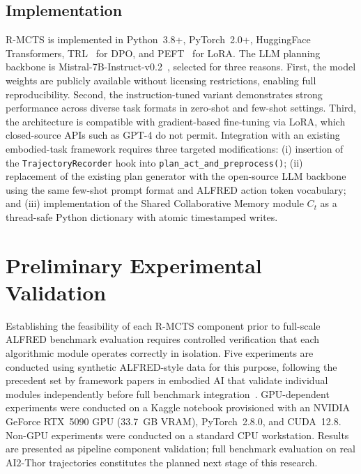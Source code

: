 \documentclass[pdflatex,sn-mathphys-num]{sn-jnl}
\theoremstyle{thmstyleone}
\theoremstyle{thmstyletwo}
\theoremstyle{thmstylethree}
\newcommand{\RMCTS}{\textsc{R-MCTS}}
\newcommand{\Ct}{C_{t}}
\begin{document}
\subsection{Implementation}

\RMCTS{} is implemented in Python~3.8+, PyTorch~2.0+, HuggingFace
Transformers, TRL~\cite{vonwerra2022trl} for DPO, and
PEFT~\cite{peft2022} for LoRA.
The LLM planning backbone is Mistral-7B-Instruct-v0.2~\cite{jiang2023mistral},
selected for three reasons.
First, the model weights are publicly available without licensing
restrictions, enabling full reproducibility.
Second, the instruction-tuned variant demonstrates strong performance
across diverse task formats in zero-shot and few-shot settings.
Third, the architecture is compatible with gradient-based fine-tuning
via LoRA, which closed-source APIs such as GPT-4 do not permit.
Integration with an existing embodied-task framework requires three
targeted modifications: (i) insertion of the \texttt{TrajectoryRecorder}
hook into \texttt{plan\_act\_and\_preprocess()}; (ii) replacement of
the existing plan generator with the open-source LLM backbone using the
same few-shot prompt format and ALFRED action token vocabulary; and
(iii) implementation of the Shared Collaborative Memory module $\Ct$
as a thread-safe Python dictionary with atomic timestamped writes.

\section{Preliminary Experimental Validation}\label{sec:experiments}

Establishing the feasibility of each \RMCTS{} component prior to
full-scale ALFRED benchmark evaluation requires controlled verification
that each algorithmic module operates correctly in isolation.
Five experiments are conducted using synthetic ALFRED-style data for
this purpose, following the precedent set by framework papers in
embodied AI that validate individual modules independently before full
benchmark integration~\cite{huang2022inner,liu2023llmp}.
GPU-dependent experiments were conducted on a Kaggle notebook
provisioned with an NVIDIA GeForce RTX~5090 GPU (33.7~GB VRAM),
PyTorch~2.8.0, and CUDA~12.8.
Non-GPU experiments were conducted on a standard CPU workstation.
Results are presented as pipeline component validation; full benchmark
evaluation on real AI2-Thor trajectories constitutes the planned next
stage of this research.
\end{document}
